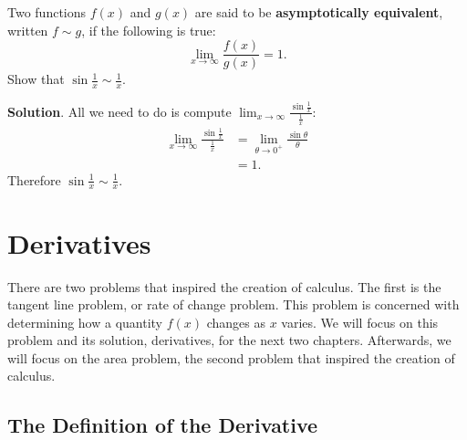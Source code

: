 \documentclass[10pt,]{book}
\newcommand{\terminology}[1]{\textbf{#1}}
\theoremstyle{ptxplainnotitle}
\theoremstyle{ptxplaintitle}
\theoremstyle{ptxplainnotitle}
\theoremstyle{ptxplaintitle}
\theoremstyle{ptxplainnotitle}
\theoremstyle{ptxplaintitle}
\theoremstyle{ptxdefinitionnotitle}
\theoremstyle{ptxdefinitiontitle}
\theoremstyle{ptxdefinitionnotitle}
\theoremstyle{ptxdefinitiontitle}
\theoremstyle{ptxdefinitionnotitle}
\theoremstyle{ptxdefinitiontitle}
\theoremstyle{ptxdefinitionnotitle}
\theoremstyle{ptxdefinitiontitle}
\theoremstyle{ptxdefinitionnotitle}
\theoremstyle{ptxdefinitiontitle}
\numberwithin{equation}{section}
\begin{document}
\begin{example}\label{example-asymptotic-equivalence}
\hypertarget{p-72}{}%
Two functions \(f(x)\) and \(g(x)\) are said to be \terminology{asymptotically equivalent}, written \(f\sim g\), if the following is true:%
\begin{equation*}
\lim_{x\to\infty}\frac{f(x)}{g(x)} = 1.
\end{equation*}
Show that \(\sin\frac{1}{x}\sim\frac{1}{x}\).%
\par\smallskip%
\noindent\textbf{Solution}.\hypertarget{solution-15}{}\quad%
\hypertarget{p-73}{}%
All we need to do is compute \(\lim_{x\to\infty}\frac{\sin\frac{1}{x}}{\frac{1}{x}}:\)%
\begin{align*}
\lim_{x\to\infty}\frac{\sin\frac{1}{x}}{\frac{1}{x}} & = \lim_{\theta\to0^{+}}\frac{\sin\theta}{\theta} \\
& = 1. 
\end{align*}
Therefore \(\sin\frac{1}{x}\sim\frac{1}{x}\).%
\end{example}
\typeout{************************************************}
\typeout{************************************************}
\chapter[{Derivatives}]{Derivatives}\label{derivatives}
\hypertarget{p-74}{}%
There are two problems that inspired the creation of calculus. The first is the tangent line problem, or rate of change problem. This problem is concerned with determining how a quantity \(f(x)\) changes as \(x\) varies. We will focus on this problem and its solution, derivatives, for the next two chapters. Afterwards, we will focus on the area problem, the second problem that inspired the creation of calculus.%
\typeout{************************************************}
\typeout{************************************************}
\section[{The Definition of the Derivative}]{The Definition of the Derivative}\label{section-the-definition-of-the-derivative}
\typeout{************************************************}
\typeout{************************************************}
\end{document}
